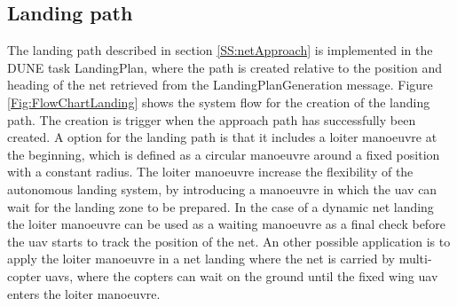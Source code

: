 \subsection{Landing path}
The landing path described in section \ref{SS:netApproach} is implemented in the DUNE task LandingPlan, where the path is created relative to the position and heading of the net retrieved from the LandingPlanGeneration message. Figure \ref{Fig:FlowChartLanding} shows the system flow for the creation of the landing path. The creation is trigger when the approach path has successfully been created. A option for the landing path is that it includes a loiter manoeuvre at the beginning, which is defined as a circular manoeuvre around a fixed position with a constant radius. The loiter manoeuvre increase the flexibility of the autonomous landing system, by introducing a manoeuvre in which the \gls{uav} can wait for the landing zone to be prepared. In the case of a dynamic net landing the loiter manoeuvre can be used as a waiting manoeuvre as a final check before the \gls{uav} starts to track the position of the net. An other possible application is to apply the loiter manoeuvre in a net landing where the net is carried by multi-copter \glspl{uav}, where the copters can wait on the ground until the fixed wing \gls{uav} enters the loiter manoeuvre.
